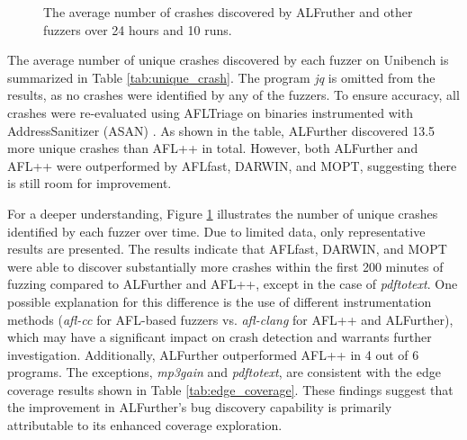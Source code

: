 \documentclass[lettersize,journal]{IEEEtran}
\begin{document}
\begin{figure}[t!]
	\caption{The average number of crashes discovered by ALFruther and other fuzzers over 24 hours and 10 runs.}
	\label{fig:unibench_crash}
\end{figure}

The average number of unique crashes discovered by each fuzzer on Unibench is summarized in Table \ref{tab:unique_crash}. The program \textit{jq} is omitted from the results, as no crashes were identified by any of the fuzzers. To ensure accuracy, all crashes were re-evaluated using AFLTriage \cite{QuicAFLTriage2025} on binaries instrumented with AddressSanitizer (ASAN) \cite{serebryanyAddressSanitizerFastAddress2012}. As shown in the table, ALFurther discovered 13.5 more unique crashes than AFL++ in total. However, both ALFurther and AFL++ were outperformed by AFLfast, DARWIN, and MOPT, suggesting there is still room for improvement.

For a deeper understanding, Figure \ref{fig:unibench_crash} illustrates the number of unique crashes identified by each fuzzer over time. Due to limited data, only representative results are presented. The results indicate that AFLfast, DARWIN, and MOPT were able to discover substantially more crashes within the first 200 minutes of fuzzing compared to ALFurther and AFL++, except in the case of \textit{pdftotext}. One possible explanation for this difference is the use of different instrumentation methods (\textit{afl-cc} for AFL-based fuzzers vs. \textit{afl-clang} for AFL++ and ALFurther), which may have a significant impact on crash detection and warrants further investigation.
Additionally, ALFurther outperformed AFL++ in 4 out of 6 programs. The exceptions, \textit{mp3gain} and \textit{pdftotext}, are consistent with the edge coverage results shown in Table \ref{tab:edge_coverage}. These findings suggest that the improvement in ALFurther’s bug discovery capability is primarily attributable to its enhanced coverage exploration.
\end{document}
